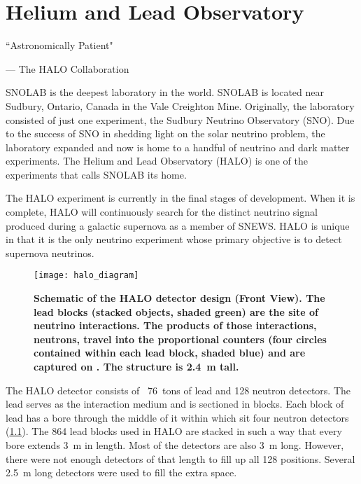 %
%
%
%


\chapter{Helium and Lead Observatory}
	\label{halo_chapter}

	\begin{quoting}
		\noindent \large ``Astronomically Patient" \normalsize

		--- The HALO Collaboration
	\end{quoting}

	 SNOLAB is the deepest laboratory in the world. SNOLAB is located near Sudbury, Ontario, Canada in the Vale Creighton Mine. Originally, the laboratory consisted of just one experiment, the Sudbury Neutrino Observatory (SNO). Due to the success of SNO in shedding light on the solar neutrino problem, the laboratory expanded and now is home to a handful of neutrino and dark matter experiments. The Helium and Lead Observatory (HALO) is one of the experiments that calls SNOLAB its home. 

	The HALO experiment is currently in the final stages of development. When it is complete, HALO will continuously search for the distinct neutrino signal produced during a galactic supernova as a member of SNEWS. HALO is unique in that it is the only neutrino experiment whose primary objective is to detect supernova neutrinos.

	\begin{figure}[H]
		\texttt{[image: halo\_diagram]}
		\caption[The HALO Detector]{\bf Schematic of the HALO detector design (Front View). \rm The lead blocks (stacked objects, shaded green) are the site of neutrino interactions. The products of those interactions, neutrons, travel into the \he proportional counters (four circles contained within each lead block, shaded blue) and are captured on \he. The structure is \SI{2.4}{\metre} tall.}
		\label{fig:halo}
	\end{figure}

	The HALO detector consists of \ \SI[mode=text]{76}{tons} of lead and 128 \he neutron detectors. The lead serves as the interaction medium and is sectioned in blocks. Each block of lead has a bore through the middle of it within which sit four \he neutron detectors \nolinebreak (\FIG \ref{fig:halo}). The 864 lead blocks used in HALO are stacked in such a way that every bore extends \SI{3}{\metre} in length. Most of the \he detectors are also \SI{3}{\metre} long. However, there were not enough detectors of that length to fill up all 128 positions. Several \SI{2.5}{\metre} long detectors were used to fill the extra space.

